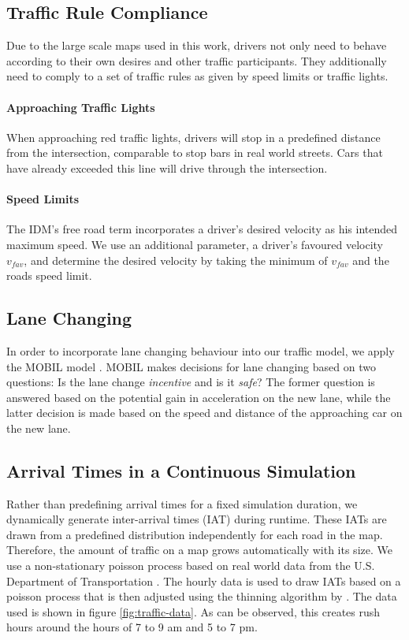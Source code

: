 \documentclass[11pt]{article}
\begin{document}
\subsection{Traffic Rule Compliance}
Due to the large scale maps used in this work, drivers not only need to behave according to their own desires and other traffic participants. They additionally need to comply to a set of traffic rules as given by speed limits or traffic lights.

\paragraph{Approaching Traffic Lights} When approaching red traffic lights, drivers will stop in a predefined distance from the intersection, comparable to stop bars in real world streets. Cars that have already exceeded this line will drive through the intersection. 

\paragraph{Speed Limits} The IDM's free road term incorporates a driver's desired velocity as his intended maximum speed. We use an additional parameter, a driver's favoured velocity $v_{fav}$, and determine the desired velocity by taking the minimum of $v_{fav}$ and the roads speed limit.

\subsection{Lane Changing}
In order to incorporate lane changing behaviour into our traffic model, we apply the MOBIL model \citep{treiber2002realistische, kesting2007general}. MOBIL makes decisions for lane changing based on two questions: Is the lane change \textit{incentive} and is it \textit{safe}? The former question is answered based on the potential gain in acceleration on the new lane, while the latter decision is made based on the speed and distance of the approaching car on the new lane.

\subsection{Arrival Times in a Continuous Simulation}
Rather than predefining arrival times for a fixed simulation duration, we dynamically generate inter-arrival times (IAT) during runtime. These IATs are drawn from a predefined distribution independently for each road in the map. Therefore, the amount of traffic on a map grows automatically with its size. We use a non-stationary poisson process based on real world data from the U.S. Department of Transportation \citep{trafficdata}. The hourly data is used to draw IATs based on a poisson process that is then adjusted using the thinning algorithm by \citet{lewis1979simulation}. The data used is shown in figure \ref{fig:traffic-data}. As can be observed, this creates rush hours around the hours of 7 to 9 am and 5 to 7 pm.
\end{document}

